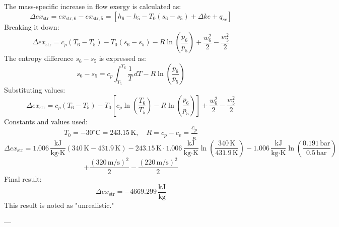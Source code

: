 The mass-specific increase in flow exergy is calculated as:  
\[
\Delta ex_{\text{str}} = ex_{\text{str},6} - ex_{\text{str},5} = [h_6 - h_5 - T_0(s_6 - s_5) + \Delta ke + q_{se}]
\]  
Breaking it down:  
\[
\Delta ex_{\text{str}} = c_p(T_6 - T_5) - T_0(s_6 - s_5) - R \ln \left(\frac{p_6}{p_5}\right) + \frac{w_6^2}{2} - \frac{w_5^2}{2}
\]  
The entropy difference \( s_6 - s_5 \) is expressed as:  
\[
s_6 - s_5 = c_p \int_{T_5}^{T_6} \frac{1}{T} \, dT - R \ln \left(\frac{p_6}{p_5}\right)
\]  
Substituting values:  
\[
\Delta ex_{\text{str}} = c_p(T_6 - T_5) - T_0 \left[c_p \ln \left(\frac{T_6}{T_5}\right) - R \ln \left(\frac{p_6}{p_5}\right)\right] + \frac{w_6^2}{2} - \frac{w_5^2}{2}
\]  
Constants and values used:  
\[
T_0 = -30^\circ\text{C} = 243.15 \, \text{K}, \quad R = c_p - c_v = \frac{c_p}{\kappa}
\]  
\[
\Delta ex_{\text{str}} = 1.006 \, \frac{\text{kJ}}{\text{kg·K}} \left(340 \, \text{K} - 431.9 \, \text{K}\right) - 243.15 \, \text{K} \cdot 1.006 \, \frac{\text{kJ}}{\text{kg·K}} \ln \left(\frac{340 \, \text{K}}{431.9 \, \text{K}}\right) - 1.006 \, \frac{\text{kJ}}{\text{kg·K}} \ln \left(\frac{0.191 \, \text{bar}}{0.5 \, \text{bar}}\right)
\]  
\[
+ \frac{(320 \, \text{m/s})^2}{2} - \frac{(220 \, \text{m/s})^2}{2}
\]  
Final result:  
\[
\Delta ex_{\text{str}} = -4669.299 \, \frac{\text{kJ}}{\text{kg}}
\]  
This result is noted as "unrealistic."

---
